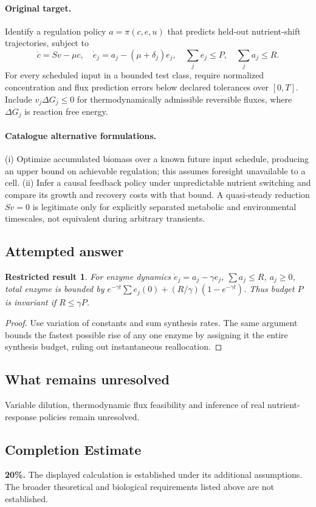 \documentclass[11pt]{article}
\newtheorem{attemptresult}{Restricted result}[section]
\begin{document}
\paragraph{Original target.}
Identify a regulation policy $a=\pi(c,e,u)$ that predicts held-out nutrient-shift trajectories, subject to
\[\dot c=Sv-\mu c,\quad \dot e_j=a_j-(\mu+\delta_j)e_j,\quad \sum_j e_j\le P,\quad \sum_j a_j\le R.\]
For every scheduled input in a bounded test class, require normalized concentration and flux prediction errors below declared tolerances over $[0,T]$. Include $v_j\Delta G_j\le0$ for thermodynamically admissible reversible fluxes, where $\Delta G_j$ is reaction free energy.
\paragraph{Catalogue alternative formulations.}
(i) Optimize accumulated biomass over a known future input schedule, producing an upper bound on achievable regulation; this assumes foresight unavailable to a cell. (ii) Infer a causal feedback policy under unpredictable nutrient switching and compare its growth and recovery costs with that bound. A quasi-steady reduction $Sv=0$ is legitimate only for explicitly separated metabolic and environmental timescales, not equivalent during arbitrary transients.
\subsection{Attempted answer}
\begin{attemptresult}
For enzyme dynamics $\dot e_j=a_j-\gamma e_j$, $\sum a_j\leq R$, $a_j\geq0$, total enzyme is bounded by $e^{-\gamma t}\sum e_j(0)+(R/\gamma)(1-e^{-\gamma t})$. Thus budget $P$ is invariant if $R\leq\gamma P$.
\end{attemptresult}
\begin{proof}
Use variation of constants and sum synthesis rates. The same argument bounds the fastest possible rise of any one enzyme by assigning it the entire synthesis budget, ruling out instantaneous reallocation.
\end{proof}
\subsection{What remains unresolved}
Variable dilution, thermodynamic flux feasibility and inference of real nutrient-response policies remain unresolved.
\subsection{Completion Estimate}
\textbf{20\%.} The displayed calculation is established under its additional assumptions. The broader theoretical and biological requirements listed above are not established.
\end{document}
